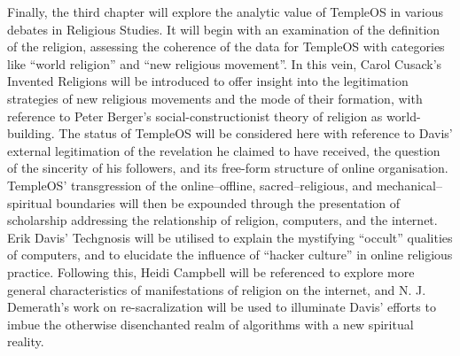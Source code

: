 \documentclass[Draft.tex]{subfiles}
\begin{document}
Finally, the third chapter will explore the analytic value of TempleOS
in various debates in Religious Studies.
It will begin with an examination of the definition of the religion,
assessing the coherence of the data for TempleOS
with categories like ``world religion'' and ``new religious movement''.
In this vein, Carol Cusack's Invented Religions will be introduced
to offer insight into the legitimation strategies of new religious movements
and the mode of their formation,
with reference to Peter Berger's social-constructionist
theory of religion as world-building.
The status of TempleOS will be considered here with reference to
Davis' external legitimation of the revelation he claimed to have received,
the question of the sincerity of his followers,
and its free-form structure of online organisation.
TempleOS' transgression of the online--offline, sacred--religious,
and mechanical--spiritual boundaries will then be expounded
through the presentation of scholarship addressing
the relationship of religion, computers, and the internet.
Erik Davis' Techgnosis will be utilised to explain
the mystifying ``occult'' qualities of computers, and to
elucidate the influence of ``hacker culture'' in online religious practice.
Following this, Heidi Campbell will be referenced to explore
more general characteristics of manifestations of religion on the internet,
and N. J. Demerath's work on re-sacralization will be used to
illuminate Davis' efforts to imbue the otherwise disenchanted
realm of algorithms with a new spiritual reality.
\end{document}
